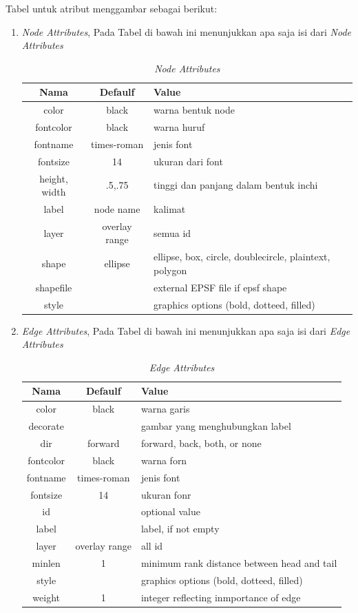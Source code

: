 \begin{enumerate}
Tabel untuk atribut menggambar sebagai berikut:
\begin{enumerate}
\item \textit{Node Attributes}, Pada Tabel di bawah ini menunjukkan apa saja isi dari \textit{Node Attributes}
\begin{table}[htbp]
\begin{center}
\caption{\textit{Node Attributes}}
\begin{tabular}{|c|c|l|}
\hline
  Nama & Defaulf & Value \\
\hline
  color & black & warna bentuk node \\
  fontcolor & black & warna huruf \\
  fontname & times-roman & jenis font \\
  fontsize & 14 & ukuran dari font \\
  height, width & .5,.75 & tinggi dan panjang dalam bentuk inchi \\
  label & node name & kalimat \\
  layer & overlay range & semua id \\
  shape & ellipse & ellipse, box, circle, doublecircle, plaintext, polygon \\
  shapefile & & external EPSF file if epsf shape \\
  style & & graphics options (bold, dotteed, filled)\\
\hline
\end{tabular}
\end{center}
\end{table}

\item \textit{Edge Attributes}, Pada Tabel di bawah ini menunjukkan apa saja isi dari \textit{Edge Attributes}

\begin{table}[htbp]
\begin{center}
\caption{\textit{Edge Attributes}}
\begin{tabular}{|c|c|l|}
\hline
  Nama & Defaulf & Value \\
\hline
  color & black & warna garis \\
  decorate & & gambar yang menghubungkan label \\
  dir & forward & forward, back, both, or none \\
  fontcolor & black & warna forn \\
  fontname & times-roman & jenis font \\
  fontsize & 14 & ukuran fonr \\
  id & & optional value \\
  label & & label, if not empty \\
  layer & overlay range & all id \\
  minlen & 1 & minimum rank distance between head and tail \\
  style & & graphics options (bold, dotteed, filled) \\
  weight & 1 & integer reflecting inmportance of edge \\
\hline
\end{tabular}
\end{center}
\end{table}


\end{enumerate}
\end{enumerate}
